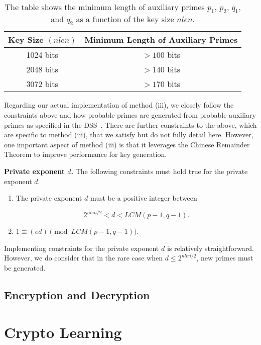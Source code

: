 \documentclass[a4paper]{article}
\begin{document}
\begin{table}[h]
\centering
\begin{tabular}{|c|c|} 
 \hline
 Key Size $(nlen)$ & Minimum Length of Auxiliary Primes\\ \hline
 1024 bits & $> 100$ bits \\ 
 2048 bits & $> 140$ bits \\ 
 3072 bits & $> 170$ bits \\
 \hline
\end{tabular}
\caption{The table shows the minimum length of auxiliary primes $p_1$, $p_2$, $q_1$, and $q_2$ as a function of the key size $nlen$.}
\label{tab:aux_len}
\end{table}

Regarding our actual implementation of method (iii), we closely follow the constraints above and how probable primes are generated from probable auxiliary primes as specified in the DSS~\cite{fips2013186}. There are further constraints to the above, which are specific to method (iii), that we satisfy but do not fully detail here. However, one important aspect of method (iii) is that it leverages the Chinese Remainder Theorem to improve performance for key generation.\newline

\noindent \textbf{Private exponent $d$.} The following constraints must hold true for the private exponent $d$.

\begin{enumerate}
    \item The private exponent $d$ must be a positive integer between

        \begin{equation}
            2^{nlen/2} < d < LCM(p-1,q-1).
        \end{equation}

    \item $1 \equiv (ed) \pmod{LCM(p-1,q-1)}$.
\end{enumerate}

Implementing constraints for the private exponent $d$ is relatively straightforward. However, we do consider that in the rare case when $d \leq 2^{nlen/2}$, new primes must be generated.

\subsection{Encryption and Decryption}

\section{Crypto Learning}
\end{document}
